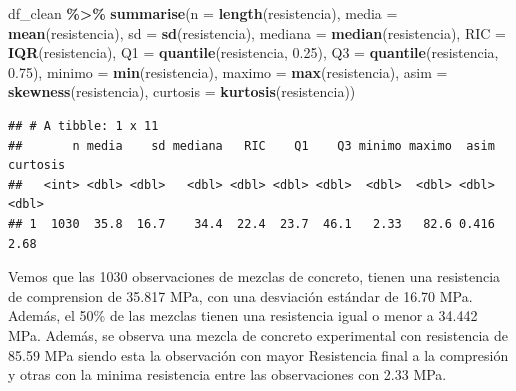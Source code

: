 \documentclass[
]{book}
\newenvironment{Shaded}{\begin{snugshade}}{\end{snugshade}}
\newcommand{\AttributeTok}[1]{\textcolor[rgb]{0.13,0.29,0.53}{#1}}
\newcommand{\FloatTok}[1]{\textcolor[rgb]{0.00,0.00,0.81}{#1}}
\newcommand{\FunctionTok}[1]{\textcolor[rgb]{0.13,0.29,0.53}{\textbf{#1}}}
\newcommand{\NormalTok}[1]{#1}
\newcommand{\SpecialCharTok}[1]{\textcolor[rgb]{0.81,0.36,0.00}{\textbf{#1}}}
\begin{document}
\begin{Shaded}
\begin{Highlighting}[]
\NormalTok{df\_clean }\SpecialCharTok{\%\textgreater{}\%} \FunctionTok{summarise}\NormalTok{(}\AttributeTok{n =} \FunctionTok{length}\NormalTok{(resistencia),}
                 \AttributeTok{media =} \FunctionTok{mean}\NormalTok{(resistencia),}
                 \AttributeTok{sd =} \FunctionTok{sd}\NormalTok{(resistencia),}
                 \AttributeTok{mediana =} \FunctionTok{median}\NormalTok{(resistencia),}
                 \AttributeTok{RIC =} \FunctionTok{IQR}\NormalTok{(resistencia),}
                 \AttributeTok{Q1 =} \FunctionTok{quantile}\NormalTok{(resistencia, }\FloatTok{0.25}\NormalTok{),}
                 \AttributeTok{Q3 =} \FunctionTok{quantile}\NormalTok{(resistencia, }\FloatTok{0.75}\NormalTok{),}
                 \AttributeTok{minimo =} \FunctionTok{min}\NormalTok{(resistencia),}
                 \AttributeTok{maximo =} \FunctionTok{max}\NormalTok{(resistencia),}
                 \AttributeTok{asim =} \FunctionTok{skewness}\NormalTok{(resistencia),}
                 \AttributeTok{curtosis =} \FunctionTok{kurtosis}\NormalTok{(resistencia))}
\end{Highlighting}
\end{Shaded}

\begin{verbatim}
## # A tibble: 1 x 11
##       n media    sd mediana   RIC    Q1    Q3 minimo maximo  asim curtosis
##   <int> <dbl> <dbl>   <dbl> <dbl> <dbl> <dbl>  <dbl>  <dbl> <dbl>    <dbl>
## 1  1030  35.8  16.7    34.4  22.4  23.7  46.1   2.33   82.6 0.416     2.68
\end{verbatim}

Vemos que las 1030 observaciones de mezclas de concreto, tienen una resistencia de comprension de 35.817 MPa, con una desviación estándar de 16.70 MPa. Además, el 50\% de las mezclas tienen una resistencia igual o menor a 34.442 MPa. Además, se observa una mezcla de concreto experimental con resistencia de 85.59 MPa siendo esta la observación con mayor Resistencia final a la compresión y otras con la minima resistencia entre las observaciones con 2.33 MPa.
\end{document}
